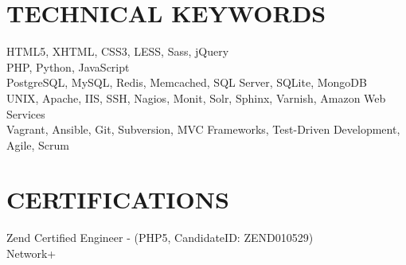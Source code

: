 \documentclass{res}
\begin{document}
\begin{resume}
\section{TECHNICAL KEYWORDS}

    HTML5, XHTML, CSS3, LESS, Sass, jQuery \\
    PHP, Python, JavaScript \\
    PostgreSQL, MySQL, Redis, Memcached, SQL Server, SQLite, MongoDB \\
    UNIX, Apache, IIS, SSH, Nagios, Monit, Solr, Sphinx, Varnish, Amazon Web Services \\
    Vagrant, Ansible, Git, Subversion, MVC Frameworks, Test-Driven Development, Agile, Scrum


\section{CERTIFICATIONS}
    Zend Certified Engineer - (PHP5, CandidateID: ZEND010529) \\
    Network+

\end{resume}
\end{document}
